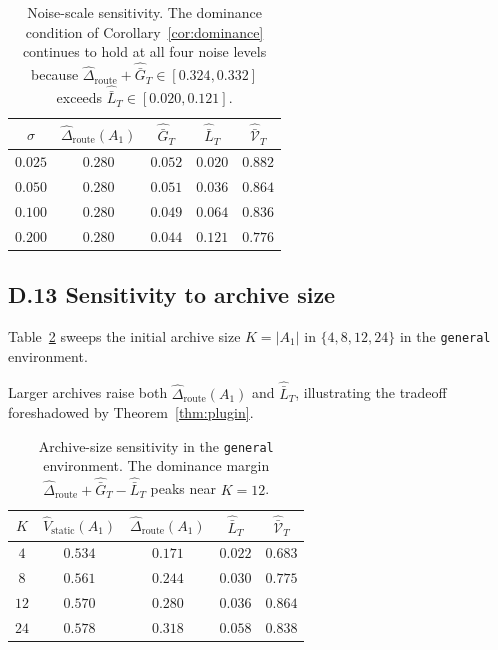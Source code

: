 \documentclass{article} %
\begin{document}
\begin{table}[h]
\centering
\small
\begin{tabular}{ccccc}
\toprule
$\sigma$ & $\widehat\Delta_{\mathrm{route}}(A_1)$ & $\widehat{\bar G}_T$ & $\widehat{\bar L}_T$ & $\widehat{\bar{\mathcal V}}_T$ \\
\midrule
$0.025$ & $0.280$ & $0.052$ & $0.020$ & $0.882$ \\
$0.050$ & $0.280$ & $0.051$ & $0.036$ & $0.864$ \\
$0.100$ & $0.280$ & $0.049$ & $0.064$ & $0.836$ \\
$0.200$ & $0.280$ & $0.044$ & $0.121$ & $0.776$ \\
\bottomrule
\end{tabular}
\caption{Noise-scale sensitivity. The dominance condition of Corollary~\ref{cor:dominance} continues to hold at all four noise levels because $\widehat\Delta_{\mathrm{route}}+\widehat{\bar G}_T \in [0.324, 0.332]$ exceeds $\widehat{\bar L}_T \in [0.020, 0.121]$.}
\label{tab:app-sigma}
\end{table}

\subsection{D.13 Sensitivity to archive size}

\label{app:tab-K}

Table~\ref{tab:app-K} sweeps the initial archive size $K = |A_1|$ in $\{4,8,12,24\}$ in the \texttt{general} environment.

Larger archives raise both $\widehat\Delta_{\mathrm{route}}(A_1)$ and $\widehat{\bar L}_T$, illustrating the tradeoff foreshadowed by Theorem~\ref{thm:plugin}.

\begin{table}[h]
\centering
\small
\begin{tabular}{ccccc}
\toprule
$K$ & $\widehat V_{\mathrm{static}}(A_1)$ & $\widehat\Delta_{\mathrm{route}}(A_1)$ & $\widehat{\bar L}_T$ & $\widehat{\bar{\mathcal V}}_T$ \\
\midrule
$4$  & $0.534$ & $0.171$ & $0.022$ & $0.683$ \\
$8$  & $0.561$ & $0.244$ & $0.030$ & $0.775$ \\
$12$ & $0.570$ & $0.280$ & $0.036$ & $0.864$ \\
$24$ & $0.578$ & $0.318$ & $0.058$ & $0.838$ \\
\bottomrule
\end{tabular}
\caption{Archive-size sensitivity in the \texttt{general} environment. The dominance margin $\widehat\Delta_{\mathrm{route}}+\widehat{\bar G}_T-\widehat{\bar L}_T$ peaks near $K=12$.}
\label{tab:app-K}
\end{table}
\end{document}
